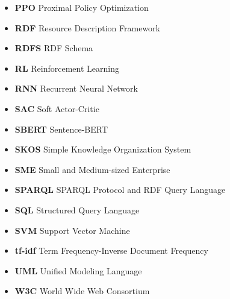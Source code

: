 \begin{itemize}
    \item \textbf{PPO} Proximal Policy Optimization
    \item \textbf{RDF} Resource Description Framework
    \item \textbf{RDFS} RDF Schema
    \item \textbf{RL} Reinforcement Learning
    \item \textbf{RNN} Recurrent Neural Network
    \item \textbf{SAC} Soft Actor-Critic
    \item \textbf{SBERT} Sentence-BERT
    \item \textbf{SKOS} Simple Knowledge Organization System
    \item \textbf{SME} Small and Medium-sized Enterprise
    \item \textbf{SPARQL} SPARQL Protocol and RDF Query Language
    \item \textbf{SQL} Structured Query Language
    \item \textbf{SVM} Support Vector Machine
    \item \textbf{tf-idf} Term Frequency-Inverse Document Frequency
    \item \textbf{UML} Unified Modeling Language
    \item \textbf{W3C} World Wide Web Consortium
\end{itemize}